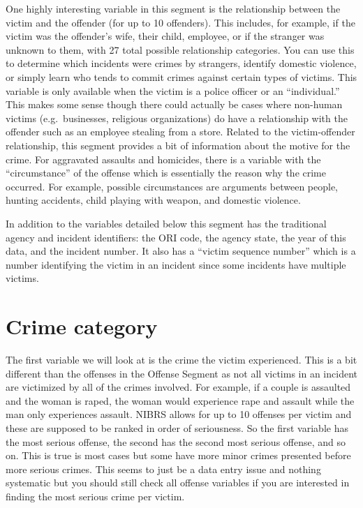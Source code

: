 \documentclass[
]{krantz}
\begin{document}
One highly interesting variable in this segment is the
relationship between the victim and the offender (for up to
10 offenders). This includes, for example, if the victim was
the offender's wife, their child, employee, or if the
stranger was unknown to them, with 27 total possible
relationship categories. You can use this to determine which
incidents were crimes by strangers, identify domestic
violence, or simply learn who tends to commit crimes against
certain types of victims. This variable is only available
when the victim is a police officer or an ``individual.''
This makes some sense though there could actually be cases
where non-human victims (e.g.~businesses, religious
organizations) do have a relationship with the offender such
as an employee stealing from a store. Related to the
victim-offender relationship, this segment provides a bit of
information about the motive for the crime. For aggravated
assaults and homicides, there is a variable with the
``circumstance'' of the offense which is essentially the
reason why the crime occurred. For example, possible
circumstances are arguments between people, hunting
accidents, child playing with weapon, and domestic violence.

In addition to the variables detailed below this segment has
the traditional agency and incident identifiers: the ORI
code, the agency state, the year of this data, and the
incident number. It also has a ``victim sequence number''
which is a number identifying the victim in an incident
since some incidents have multiple victims.

\section{Crime category}\label{crime-category-1}

The first variable we will look at is the crime the victim
experienced. This is a bit different than the offenses in
the Offense Segment as not all victims in an incident are
victimized by all of the crimes involved. For example, if a
couple is assaulted and the woman is raped, the woman would
experience rape and assault while the man only experiences
assault. NIBRS allows for up to 10 offenses per victim and
these are supposed to be ranked in order of seriousness. So
the first variable has the most serious offense, the second
has the second most serious offense, and so on. This is true
is most cases but some have more minor crimes presented
before more serious crimes. This seems to just be a data
entry issue and nothing systematic but you should still
check all offense variables if you are interested in finding
the most serious crime per victim.
\end{document}
